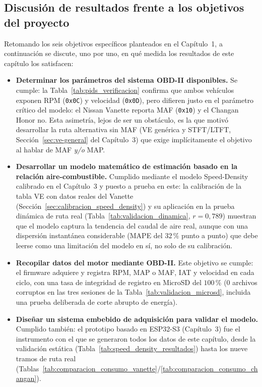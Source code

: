 \subsection{Discusión de resultados frente a los objetivos del proyecto}

Retomando los seis objetivos específicos planteados en el Capítulo~1, a continuación se discute, uno por uno, en qué medida los resultados de este capítulo los satisfacen:

\begin{itemize}
	\item \textbf{Determinar los parámetros del sistema OBD-II disponibles.} Se cumple: la Tabla~\ref{tab:pids_verificacion} confirma que ambos vehículos exponen RPM (\texttt{0x0C}) y velocidad (\texttt{0x0D}), pero difieren justo en el parámetro crítico del modelo: el Nissan Vanette reporta MAF (\texttt{0x10}) y el Changan Honor no. Esta asimetría, lejos de ser un obstáculo, es la que motivó desarrollar la ruta alternativa sin MAF (VE genérica y STFT/LTFT, Sección~\ref{sec:ve-general} del Capítulo~3) que exige implícitamente el objetivo al hablar de MAF \emph{y/o} MAP.

	\item \textbf{Desarrollar un modelo matemático de estimación basado en la relación aire-combustible.} Cumplido mediante el modelo Speed-Density calibrado en el Capítulo~3 y puesto a prueba en este: la calibración de la tabla VE con datos reales del Vanette (Sección~\ref{sec:calibracion_speed_density}) y su aplicación en la prueba dinámica de ruta real (Tabla~\ref{tab:validacion_dinamica}, $r=0{,}789$) muestran que el modelo captura la tendencia del caudal de aire real, aunque con una dispersión instantánea considerable (MAPE del $32\,\%$ punto a punto) que debe leerse como una limitación del modelo en sí, no solo de su calibración.

	\item \textbf{Recopilar datos del motor mediante OBD-II.} Este objetivo se cumple: el firmware adquiere y registra RPM, MAP o MAF, IAT y velocidad en cada ciclo, con una tasa de integridad de registro en MicroSD del $100\,\%$ (0 archivos corruptos en las tres sesiones de la Tabla~\ref{tab:validacion_microsd}, incluida una prueba deliberada de corte abrupto de energía).

	\item \textbf{Diseñar un sistema embebido de adquisición para validar el modelo.} Cumplido también: el prototipo basado en ESP32-S3 (Capítulo~3) fue el instrumento con el que se generaron todos los datos de este capítulo, desde la validación estática (Tabla~\ref{tab:speed_density_resultados}) hasta los nueve tramos de ruta real (Tablas~\ref{tab:comparacion_consumo_vanette}/\ref{tab:comparacion_consumo_changan}).


\end{itemize}

